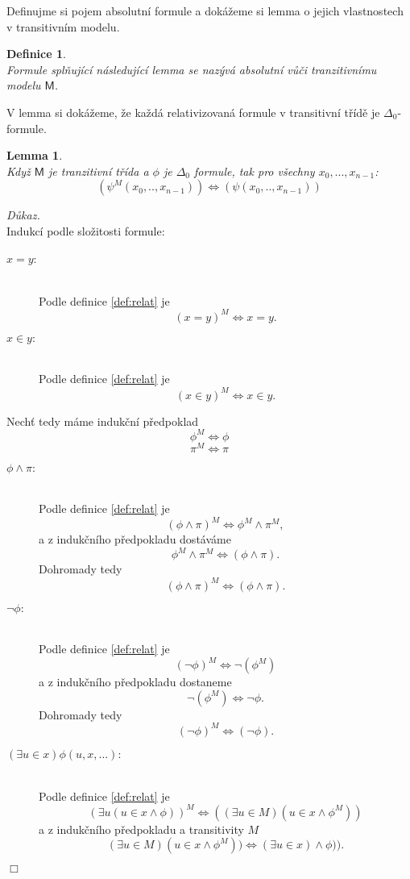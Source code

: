 \documentclass[12pt,a4paper]{article}
\newtheorem{lemma}[veta]{Lemma}
\newtheorem{definice}[veta]{Definice}
\newenvironment{proof}
{\noindent \textit{D\r{u}kaz.}}
{\hspace*{\fill} $\Box$}
\begin{document}
\newpage
Definujme si pojem absolutn\'{i} formule a dok\'{a}\v{z}eme si lemma o jejich vlastnostech v transitivn\'{i}m modelu.
\begin{definice}
~\\
Formule spl\v{n}uj\'{i}c\'{i} n\'{a}sleduj\'{i}c\'{i} lemma se naz\'{y}v\'{a} absolutn\'{i} v\r{u}\v{c}i tranzitivn\'{i}mu modelu $  \textsf{M} $.
\end{definice} 
V lemma si dok\'{a}\v{z}eme, \v{z}e ka\v{z}d\'{a} relativizovan\'{a} formule v transitivn\'{i} t\v{r}\'{i}d\v{e} je $\Delta_0$-formule.
\begin{lemma}
~\\\label{lem:transa}
Kdy\v{z} $  \textsf{M} $ je tranzitivn\'{i} t\v{r}\'{i}da a $\phi$ je $\Delta_0$ formule, tak pro v\v{s}echny $ x_0,...,x_{n-1} $: 
 \[ (\psi^{M}(x_0,..,x_{n-1})) \Leftrightarrow (\psi(x_0,..,x_{n-1})) \]

\end{lemma}
\begin{proof}
~\\
Indukc\'{i} podle slo\v{z}itosti formule:\begin{description}
\item[$x=y$:]
~\\
Podle definice \ref{def:relat} je \[ (x=y)^{M} \Leftrightarrow x=y  .\]
\item[$x \in y: $]
~\\
Podle definice \ref{def:relat} je \[ (x\in y)^{M} \Leftrightarrow x\in y .\]
\end{description}
Nech\v{t} tedy m\'{a}me induk\v{c}n\'{i} p\v{r}edpoklad   \[ \phi^{M} \Leftrightarrow \phi \]    \[ \pi^{M} \Leftrightarrow \pi \]  
\begin{description}
\item[$\phi \wedge \pi: $] ~\\
Podle definice \ref{def:relat} je 
\[ (\phi \wedge \pi)^{M} \Leftrightarrow \phi^{M}\wedge \pi^{M}  ,\] 
a z induk\v{c}n\'{i}ho p\v{r}edpokladu dost\'{a}v\'{a}me
\[ \phi^{M}\wedge \pi^{M} \Leftrightarrow (\phi \wedge \pi) .\]
Dohromady tedy \[ (\phi \wedge \pi)^{M} \Leftrightarrow  (\phi \wedge \pi) .\] 
\item[$\neg \phi: $]~\\
Podle definice \ref{def:relat} je 
\[ (\neg \phi)^{M} \Leftrightarrow \neg (\phi^{M})  \] 
a z induk\v{c}n\'{i}ho p\v{r}edpokladu dostaneme
\[ \neg (\phi^{M})  \Leftrightarrow \neg \phi .\]
Dohromady tedy \[ (\neg \phi )^{M} \Leftrightarrow  (\neg \phi ) .\] 
\item[$(\exists u\in x)\phi(u,x,...): $]~ \\
Podle definice \ref{def:relat} je 
\[  (\exists u(u\in x \wedge \phi))^{M} \Leftrightarrow ((\exists u \in M) (u\in x \wedge \phi^{M})) \]
a z induk\v{c}n\'{i}ho p\v{r}edpokladu a transitivity $ M $
\[ (\exists u \in M) (u\in x \wedge \phi^{M})) \Leftrightarrow (\exists u \in  x) \wedge \phi))  .\]
\end{description}\end{proof}
\end{document}
